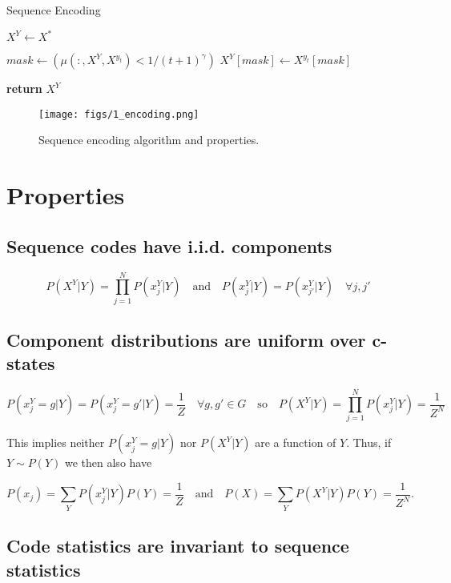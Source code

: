 \documentclass{article}
\begin{document}
\begin{algorithm}
\caption{Sequence Encoding}

\begin{algorithmic}[0]
\State $X^Y \gets X^*$

\State $mask \gets (\mu(:, X^Y, X^{y_t}) < 1/(t+1)^\gamma)$
\State $X^Y[mask] \gets X^{y_t}[mask]$

\EndFor

\State \textbf{return} $X^Y$
\EndFunction

\end{algorithmic}
\end{algorithm}

 \begin{figure}[!t]
    \centering
    \texttt{[image: figs/1\_encoding.png]}
    \caption{Sequence encoding algorithm and properties.}
 \end{figure}

\section{Properties}

\subsection{Sequence codes have i.i.d. components}
\label{sec:prop-comp-iid}

$$P(X^Y|Y) = \prod\limits_{j=1}^N P(x^Y_j|Y) \quad \textrm{and} \quad P(x^Y_j|Y) = P(x^Y_{j'}|Y) \quad \forall j, j'$$

\subsection{Component distributions are uniform over c-states}
\label{sec:prop-unif-comp-dstr}

$$P(x^Y_j = g|Y) = P(x^Y_j = g'|Y) = \frac{1}{Z} \quad \forall g, g' \in G \quad \textrm{so} \quad P(X^Y|Y) = \prod\limits_{j=1}^N P(x^Y_j|Y) = \frac{1}{Z^N}$$

This implies neither $P(x^Y_j = g|Y)$ nor $P(X^Y|Y)$ are a function of $Y$. Thus, if $Y \sim P(Y)$ we then also have

$$P(x_j) = \sum\limits_Y P(x^Y_j|Y)P(Y) = \frac{1}{Z} \quad \textrm{and} \quad P(X) = \sum\limits_Y P(X^Y|Y)P(Y) = \frac{1}{Z^N}.$$

\subsection{Code statistics are invariant to sequence statistics}
\end{document}
